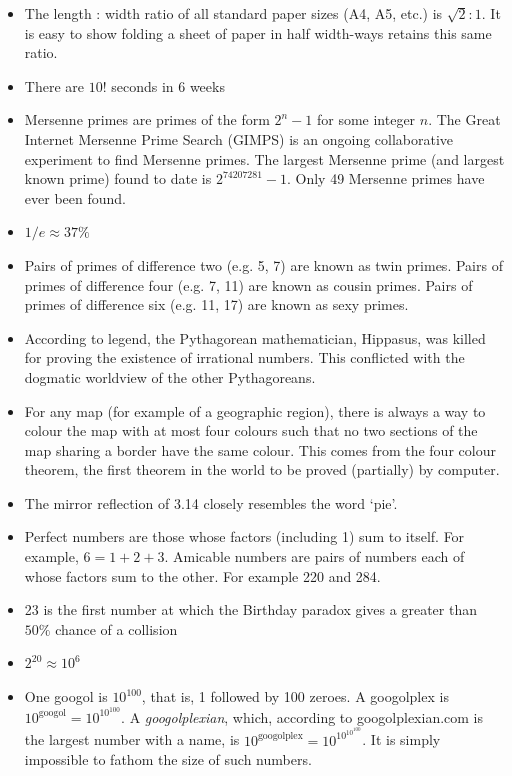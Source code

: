 \documentclass[11pt]{amsart}
\begin{document}
\begin{itemize}
\item The length : width ratio of all standard paper sizes (A4, A5, etc.) is $\sqrt{2}:1$. It is easy to show folding a sheet of paper in half width-ways retains this same ratio. 
\item There are $10!$ seconds in 6 weeks
\item Mersenne primes are primes of the form $2^n - 1$ for some integer $n$. The Great Internet Mersenne Prime Search (GIMPS) is an ongoing collaborative experiment to find Mersenne primes. The largest Mersenne prime (and largest known prime) found to date is $2^{74207281} - 1$. Only 49 Mersenne primes have ever been found.
\item $1/e \approx 37\%$
\item Pairs of primes of difference two (e.g. 5, 7) are known as twin primes. Pairs of primes of difference four (e.g. 7, 11) are known as cousin primes. Pairs of primes of difference six (e.g. 11, 17) are known as sexy primes.
\item According to legend, the Pythagorean mathematician, Hippasus, was killed for proving the existence of irrational numbers. This conflicted with the dogmatic worldview of the other Pythagoreans.
\item For any map (for example of a geographic region), there is always a way to colour the map with at most four colours such that no two sections of the map sharing a border have the same colour. This comes from the four colour theorem, the first theorem in the world to be proved (partially) by computer.
\item The mirror reflection of 3.14 closely resembles the word `pie'.
\item Perfect numbers are those whose factors (including 1) sum to itself. For example, $6 = 1 + 2 + 3$. Amicable numbers are pairs of numbers each of whose factors sum to the other. For example 220 and 284.
\item 23 is the first number at which the Birthday paradox gives a greater than $50\%$ chance of a collision
\item $2^{20} \approx 10^6$
\item One googol is $10^{100}$, that is, 1 followed by 100 zeroes. A googolplex is $10^{\text{googol}} = 10^{10^{100}}$. A \emph{googolplexian}, which, according to googolplexian.com is the largest number with a name, is $10^{\text{googolplex}} = 10^{10^{10^{100}}}$. It is simply impossible to fathom the size of such numbers.

\end{itemize}
\end{document}
